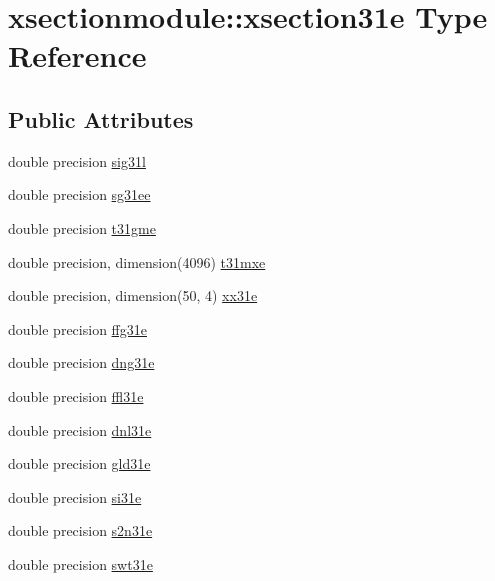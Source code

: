 \hypertarget{structxsectionmodule_1_1xsection31e}{}\section{xsectionmodule\+:\+:xsection31e Type Reference}
\label{structxsectionmodule_1_1xsection31e}
\subsection*{Public Attributes}
\begin{DoxyCompactItemize}
\item 
double precision \hyperlink{structxsectionmodule_1_1xsection31e_abb0523ea0130f93537c82ea4a3e908e6}{sig31l}
\item 
double precision \hyperlink{structxsectionmodule_1_1xsection31e_aed38f7b14c48a3a38b5e508fc73bf3ad}{sg31ee}
\item 
double precision \hyperlink{structxsectionmodule_1_1xsection31e_a5a8ec28e09fb7f73916f0d036f907fb3}{t31gme}
\item 
double precision, dimension(4096) \hyperlink{structxsectionmodule_1_1xsection31e_ac22bccdd6d4521e3e1b8684820186106}{t31mxe}
\item 
double precision, dimension(50, 4) \hyperlink{structxsectionmodule_1_1xsection31e_a181bc142ce3551e5d9e96e9e664971c9}{xx31e}
\item 
double precision \hyperlink{structxsectionmodule_1_1xsection31e_ae347282f80614bab80d1cf34ca0fd762}{ffg31e}
\item 
double precision \hyperlink{structxsectionmodule_1_1xsection31e_a6dfbffef044283f1431667502027bb42}{dng31e}
\item 
double precision \hyperlink{structxsectionmodule_1_1xsection31e_ac571ee5550291ef4dd8ce499d343b28b}{ffl31e}
\item 
double precision \hyperlink{structxsectionmodule_1_1xsection31e_ac06b976d40ceb55ed4f672e253e3c0e3}{dnl31e}
\item 
double precision \hyperlink{structxsectionmodule_1_1xsection31e_a1a39e2f29fb24e5cfe65484f92e5fb76}{gld31e}
\item 
double precision \hyperlink{structxsectionmodule_1_1xsection31e_ad88dfaa8e342c6f09d026e994b481990}{si31e}
\item 
double precision \hyperlink{structxsectionmodule_1_1xsection31e_af63782e86534b2ed37e4b105c7bd033b}{s2n31e}
\item 
double precision \hyperlink{structxsectionmodule_1_1xsection31e_ab77ee548d2cd441b18f14afd5e46f5f1}{swt31e}

\end{DoxyCompactItemize}
